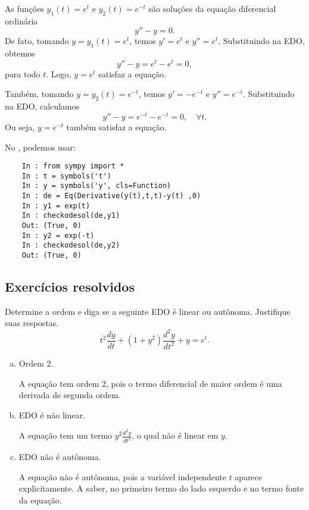 \begin{ex}
  As funções $y_1(t) = e^t$ e $y_2(t) = e^{-t}$ são soluções da equação diferencial ordinária
  \begin{equation}
    y'' - y = 0.
  \end{equation}
  De fato, tomando $y = y_1(t) = e^t$, temos $y' = e^t$ e $y'' = e^t$. Substituindo na EDO, obtemos
  \begin{equation}
    y'' - y = e^t - e^t = 0,
  \end{equation}
  para todo $t$. Logo, $y = e^t$ satisfaz a equação.
  
  Também, tomando $y = y_2(t) = e^{-t}$, temos $y' = -e^{-t}$ e $y'' = e^{-t}$. Substituindo na EDO, calculamos
  \begin{equation}
    y'' - y = e^{-t} - e^{-t} = 0, \quad\forall t.
  \end{equation}
  Ou seja, $y = e^{-t}$ também satisfaz a equação.

  \ifispython
  No \python, podemos usar:
  \begin{lstlisting}
    In : from sympy import *
    In : t = symbols('t')
    In : y = symbols('y', cls=Function)
    In : de = Eq(Derivative(y(t),t,t)-y(t) ,0)
    In : y1 = exp(t)
    In : checkodesol(de,y1)
    Out: (True, 0)
    In : y2 = exp(-t)
    In : checkodesol(de,y2)
    Out: (True, 0)
  \end{lstlisting}
  \fi
\end{ex}

\subsection*{Exercícios resolvidos}

\begin{exeresol}
  Determine a ordem e diga se a seguinte EDO é linear ou autônoma. Justifique suas respostas.
  \begin{equation}
    t^2\frac{dy}{dt} + (1+y^2)\frac{d^2y}{dt^2} + y = e^t.
  \end{equation}
\end{exeresol}
\begin{resol}
  \begin{enumerate}[a)]
  \item Ordem 2.

    A equação tem ordem 2, pois o termo diferencial de maior ordem é uma derivada de segunda ordem.

  \item EDO é não linear.

    A equação tem um termo $\displaystyle y^2\frac{d^2y}{dt^2}$, o qual não é linear em $y$.

  \item EDO não é autônoma.

    A equação não é autônoma, pois a variável independente $t$ aparece explicitamente. A saber, no primeiro termo do lado esquerdo e no termo fonte da equação.
  \end{enumerate}
\end{resol}

